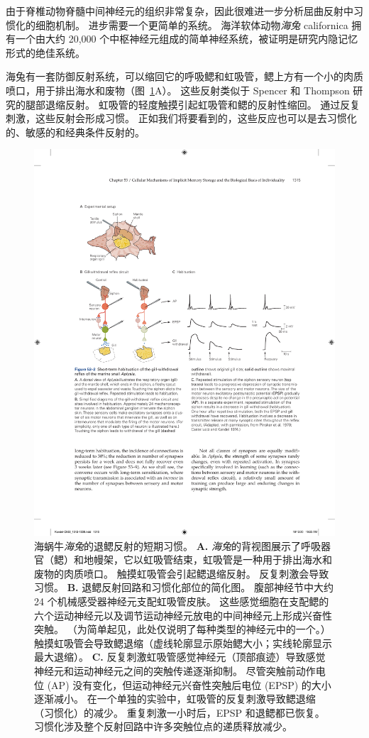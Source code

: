 由于脊椎动物脊髓中间神经元的组织非常复杂，因此很难进一步分析屈曲反射中习惯化的细胞机制。
进步需要一个更简单的系统。
海洋软体动物\textit{海兔} californica 拥有一个由大约 20,000 个中枢神经元组成的简单神经系统，被证明是研究内隐记忆形式的绝佳系统。


海兔有一套防御反射系统，可以缩回它的呼吸鳃和虹吸管，鳃上方有一个小的肉质喷口，用于排出海水和废物（图~\ref{fig:53_2}A）。
这些反射类似于 Spencer 和 Thompson 研究的腿部退缩反射。
虹吸管的轻度触摸引起虹吸管和鳃的反射性缩回。
通过反复刺激，这些反射会形成习惯。
正如我们将要看到的，这些反应也可以是去习惯化的、敏感的和经典条件反射的。


\begin{figure}[htbp]
	\centering
	\includegraphics[width=0.9\linewidth]{chap53/fig_53_2}
	\caption{海蜗牛\textit{海兔}的退鳃反射的短期习惯。
		\textbf{A.} \textit{海兔}的背视图展示了呼吸器官（鳃）和地幔架，它以虹吸管结束，虹吸管是一种用于排出海水和废物的肉质喷口。
		触摸虹吸管会引起鳃退缩反射。
		反复刺激会导致习惯。
		\textbf{B.} 退鳃反射回路和习惯化部位的简化图。
		腹部神经节中大约 24 个机械感受器神经元支配虹吸管皮肤。
		这些感觉细胞在支配鳃的六个运动神经元以及调节运动神经元放电的中间神经元上形成兴奋性突触。
		（为简单起见，此处仅说明了每种类型的神经元中的一个。）触摸虹吸管会导致鳃退缩（虚线轮廓显示原始鳃大小；实线轮廓显示最大退缩）。
		\textbf{C.} 反复刺激虹吸管感觉神经元（顶部痕迹）导致感觉神经元和运动神经元之间的突触传递逐渐抑制。
		尽管突触前动作电位 (AP) 没有变化，但运动神经元兴奋性突触后电位 (EPSP) 的大小逐渐减小。
		在一个单独的实验中，虹吸管的反复刺激导致鳃退缩（习惯化）的减少。
		重复刺激一小时后，EPSP 和退鳃都已恢复。
		习惯化涉及整个反射回路中许多突触位点的递质释放减少\cite{pinsker1970habituation}。}
	\label{fig:53_2}
\end{figure}


